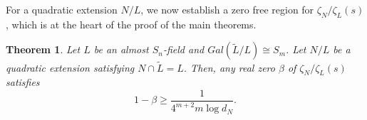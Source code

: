 \documentclass[12pt]{amsart}
\newtheorem{theorem}{Theorem}[section]
\theoremstyle{definition}
\begin{document}

For a quadratic extension $N/L$, we now establish a zero free region for $\zeta_N/\zeta_L(s)$, which is at the heart of the proof of the main theorems. 


\begin{theorem}\label{zero-free-almost-S_n}
    Let $L$ be an almost $S_n$-field and $Gal(\widetilde{L}/L)\cong S_m$. Let $N/L$ be a quadratic extension satisfying $N\cap \widetilde{L} = L$. Then, any real zero $\beta$ of $\zeta_N/\zeta_L(s)$ satisfies
    \begin{equation*}
        1-\beta \geq \frac{1}{4^{m+2} m\log d_N}.
    \end{equation*}
\end{theorem}
\end{document}
